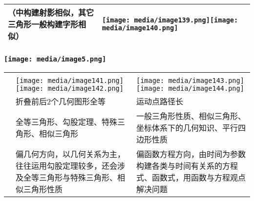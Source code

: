 \documentclass[a4paper,11pt,UTF8]{ctexart}
\begin{document}
\begin{longtable}[]{@{}lll@{}}
\begin{minipage}[t]{0.30\columnwidth}
\textbf{（中构建射影相似，其它三角形一般构建字形相似）}\strut
\end{minipage} & \begin{minipage}[t]{0.30\columnwidth}\raggedright
\texttt{[image: media/image139.png]}\texttt{[image: media/image140.png]}\strut
\end{minipage}\tabularnewline
\bottomrule
\end{longtable}

\hypertarget{ux5b66ux79d1ux7f51www.zxxk.com--ux6559ux80b2ux8d44ux6e90ux95e8ux6237ux63d0ux4f9bux8bd5ux9898ux8bd5ux5377ux6559ux6848ux8bfeux4ef6ux6559ux5b66ux8bbaux6587ux7d20ux6750ux7b49ux5404ux7c7bux6559ux5b66ux8d44ux6e90ux5e93ux4e0bux8f7dux8fd8ux6709ux5927ux91cfux4e30ux5bccux7684ux6559ux5b66ux8d44ux8baf-26}{%
\subsubsection{\texorpdfstring{\protect\texttt{[image: media/image5.png]}}{学科网(www.zxxk.com)-\/-教育资源门户，提供试题试卷、教案、课件、教学论文、素材等各类教学资源库下载，还有大量丰富的教学资讯！}}\label{ux5b66ux79d1ux7f51www.zxxk.com--ux6559ux80b2ux8d44ux6e90ux95e8ux6237ux63d0ux4f9bux8bd5ux9898ux8bd5ux5377ux6559ux6848ux8bfeux4ef6ux6559ux5b66ux8bbaux6587ux7d20ux6750ux7b49ux5404ux7c7bux6559ux5b66ux8d44ux6e90ux5e93ux4e0bux8f7dux8fd8ux6709ux5927ux91cfux4e30ux5bccux7684ux6559ux5b66ux8d44ux8baf-26}}

\begin{longtable}[]{@{}lll@{}}
\toprule
\endhead
& &\tabularnewline
& \texttt{[image: media/image141.png]}
\texttt{[image: media/image142.png]} &
\texttt{[image: media/image143.png]}
\texttt{[image: media/image144.png]}\tabularnewline
& 折叠前后2个几何图形全等 & 运动点路径长\tabularnewline
& 全等三角形、勾股定理、特殊三角形、相似三角形 &
一般三角形性质、相似三角形、坐标体系下的几何知识、平行四边形性质\tabularnewline
&
偏几何方向，以几何关系为主，往往运用勾股定理较多，还会涉及全等三角形与特殊三角形、相似三角形性质
&
偏函数方程方向，由时间为参数构建各类与时间有关系的方程式、函数式，用函数与方程观点解决问题\tabularnewline
\bottomrule
\end{longtable}

\hypertarget{section-21}{%
\subsubsection{}\label{section-21}}
\end{document}
